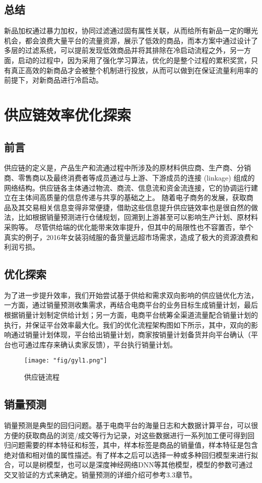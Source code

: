 \subsection{总结}
新品加权通过暴力加权，协同过滤通过固有属性关联，从而给所有新品一定的曝光机会，都会浪费大量平台的流量资源，展示了低效的商品，而本方案中通过设计了多层的过滤系统，可以提前发现低效商品并将其排除在冷启动流程之外，另一方面，启动的过程中，因为采用了强化学习算法，优化的是整个过程的累积奖赏，只有真正高效的新商品才会被整个机制进行投放，从而可以做到在保证流量利用率的前提下，对新商品进行冷启动。




\section{供应链效率优化探索}
\subsection{前言}
供应链的定义是，产品生产和流通过程中所涉及的原材料供应商、生产商、分销商、零售商以及最终消费者等成员通过与上游、下游成员的连接 (linkage) 组成的网络结构。供应链各主体通过物流、商流、信息流和资金流连接，它的协调运行建立在主体间高质量的信息传递与共享的基础之上。
随着电子商务的发展，获取商品及其交易相关信息变得非常便捷，借助这些信息提升供应链效率也是很自然的做法，比如根据销量预测进行仓储规划，回溯到上游甚至可以影响生产计划、原材料采购等。
尽管供给端的优化能带来效率提升，但其中的局限性也不容置否，举个真实的例子，2016年女装羽绒服的备货量远超市场需求，造成了极大的资源浪费和利润亏损。
\subsection{优化探索}
为了进一步提升效率，我们开始尝试基于供给和需求双向影响的供应链优化方法，一方面，通过销量预测收集需求，再结合电商平台的业务目标生成销量计划，最后根据销量计划制定供给计划；另一方面，电商平台统筹全渠道流量配合销量计划的执行，并保证平台效率最大化。我们的优化流程架构图如下所示，其中，双向的影响通过销量计划体现，平台给出销量计划，商家按销量计划备货并向平台确认（平台也可通过库存来确认卖家反馈），平台执行销量计划。

\begin{figure}[!h]
	\centering
	\texttt{[image: "fig/gyl1.png"]}
	\caption{供应链流程}
	\label{fig:gyl1}
\end{figure}

\subsection{销量预测}
销量预测是典型的回归问题。基于电商平台的海量日志和大数据计算平台，可以很方便的获取商品的浏览/成交等行为记录，对这些数据进行一系列加工便可得到回归问题需要的样本特征和标签，其中，样本标签是商品的销量值，样本特征是包含绝对值和相对值的属性描述。有了样本之后可以选择一种或多种回归模型来进行拟合，可以是树模型，也可以是深度神经网络DNN等其他模型，模型的参数可通过交叉验证的方式来确定。销量预测的详细介绍可参考3.3章节。
